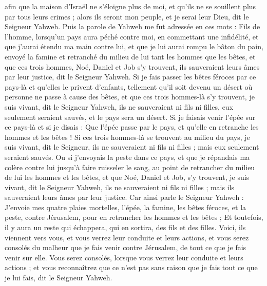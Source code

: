 \begin{multicols}{2}
afin que la maison d'Israël ne s'éloigne plus de moi, et qu'ils ne se souillent plus par tous leurs crimes ; alors ils seront mon peuple, et je serai leur Dieu, dit le Seigneur Yahweh.
Puis la parole de Yahweh me fut adressée en ces mots :
Fils de l'homme, lorsqu'un pays aura péché contre moi, en commettant une infidélité, et que j'aurai étendu ma main contre lui, et que je lui aurai rompu le bâton du pain, envoyé la famine et retranché du milieu de lui tant les hommes que les bêtes,
et que ces trois hommes, Noé, Daniel et Job s'y trouvent, ils sauveraient leurs âmes par leur justice, dit le Seigneur Yahweh.
Si je fais passer les bêtes féroces par ce pays-là et qu'elles le privent d'enfants, tellement qu'il soit devenu un désert où personne ne passe à cause des bêtes,
et que ces trois hommes-là s'y trouvent, je suis vivant, dit le Seigneur Yahweh, ils ne sauveraient ni fils ni filles, eux seulement seraient sauvés, et le pays sera un désert.
Si je faisais venir l'épée sur ce pays-là et si je disais : Que l'épée passe par le pays, et qu'elle en retranche les hommes et les bêtes !
Si ces trois hommes-là se trouvent au milieu du pays, je suis vivant, dit le Seigneur, ils ne sauveraient ni fils ni filles ; mais eux seulement seraient sauvés.
Ou si j'envoyais la peste dans ce pays, et que je répandais ma colère contre lui jusqu'à faire ruisseler le sang, au point de retrancher du milieu de lui les hommes et les bêtes,
et que Noé, Daniel et Job, s'y trouvent, je suis vivant, dit le Seigneur Yahweh, ils ne sauveraient ni fils ni filles ; mais ils sauveraient leurs âmes par leur justice.
Car ainsi parle le Seigneur Yahweh : J'envoie mes quatre plaies mortelles, l'épée, la famine, les bêtes féroces, et la peste, contre Jérusalem, pour en retrancher les hommes et les bêtes ;
Et toutefois, il y aura un reste qui échappera, qui en sortira, des fils et des filles. Voici, ils viennent vers vous, et vous verrez leur conduite et leurs actions, et vous serez consolés du malheur que je fais venir contre Jérusalem, de tout ce que je fais venir sur elle.
Vous serez consolés, lorsque vous verrez leur conduite et leurs actions ; et vous reconnaîtrez que ce n'est pas sans raison que je fais tout ce que je lui fais, dit le Seigneur Yahweh.

\end{multicols}
